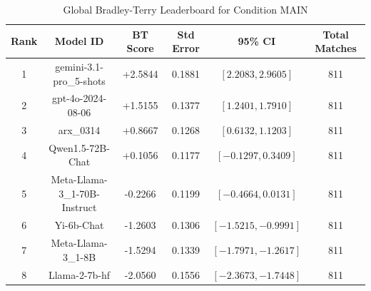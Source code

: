 \begin{table}[ht]
\centering
\caption{Global Bradley-Terry Leaderboard for Condition \textsc{MAIN}}
\label{tab:leaderboard_main}
\begin{tabular}{cccccc}
\hline
\textbf{Rank} & \textbf{Model ID} & \textbf{BT Score} & \textbf{Std Error} & \textbf{95\% CI} & \textbf{Total Matches} \\
\hline
1 & gemini-3.1-pro\_5-shots & +2.5844 & 0.1881 & $[2.2083, 2.9605]$ & 811 \\
2 & gpt-4o-2024-08-06 & +1.5155 & 0.1377 & $[1.2401, 1.7910]$ & 811 \\
3 & arx\_0314 & +0.8667 & 0.1268 & $[0.6132, 1.1203]$ & 811 \\
4 & Qwen1.5-72B-Chat & +0.1056 & 0.1177 & $[-0.1297, 0.3409]$ & 811 \\
5 & Meta-Llama-3\_1-70B-Instruct & -0.2266 & 0.1199 & $[-0.4664, 0.0131]$ & 811 \\
6 & Yi-6b-Chat & -1.2603 & 0.1306 & $[-1.5215, -0.9991]$ & 811 \\
7 & Meta-Llama-3\_1-8B & -1.5294 & 0.1339 & $[-1.7971, -1.2617]$ & 811 \\
8 & Llama-2-7b-hf & -2.0560 & 0.1556 & $[-2.3673, -1.7448]$ & 811 \\
\hline
\end{tabular}
\end{table}
